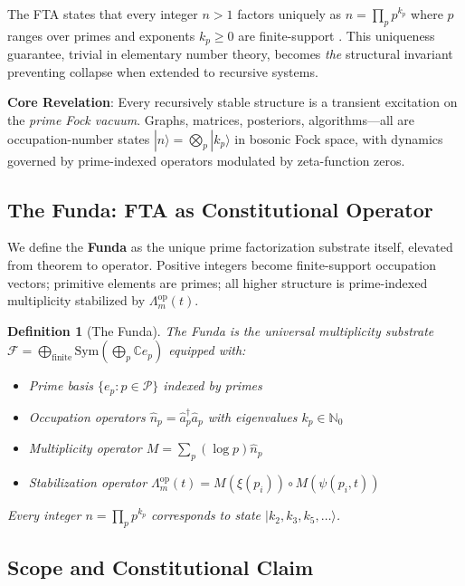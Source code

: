 \documentclass[12pt]{amsart}
\theoremstyle{plain}
\newtheorem{definition}[theorem]{Definition}
\begin{document}
The FTA states that every integer \(n > 1\) factors uniquely as \(n = \prod_p p^{k_p}\) where \(p\) ranges over primes and exponents \(k_p \geq 0\) are finite-support \cite{HardyWright1979}. This uniqueness guarantee, trivial in elementary number theory, becomes \emph{the} structural invariant preventing collapse when extended to recursive systems.

\textbf{Core Revelation}: Every recursively stable structure is a transient excitation on the \emph{prime Fock vacuum}. Graphs, matrices, posteriors, algorithms---all are occupation-number states \(|n\rangle = \bigotimes_p |k_p\rangle\) in bosonic Fock space, with dynamics governed by prime-indexed operators modulated by zeta-function zeros.

\subsection{The Funda: FTA as Constitutional Operator}

We define the \textbf{Funda} as the unique prime factorization substrate itself, elevated from theorem to operator. Positive integers become finite-support occupation vectors; primitive elements are primes; all higher structure is prime-indexed multiplicity stabilized by \(\Lambda_m^{\text{op}}(t)\).

\begin{definition}[The Funda]
The Funda is the universal multiplicity substrate \\ \(\mathcal{F} = \bigoplus_{\text{finite}} \text{Sym}(\bigoplus_p \mathbb{C} e_p)\) equipped with:
\begin{itemize}
\item Prime basis \(\{e_p : p \in \mathcal{P}\}\) indexed by primes
\item Occupation operators \(\hat{n}_p = \hat{a}_p^\dagger \hat{a}_p\) with eigenvalues \(k_p \in \mathbb{N}_0\)
\item Multiplicity operator \(M = \sum_p (\log p) \hat{n}_p\)
\item Stabilization operator \(\Lambda_m^{\text{op}}(t) = M(\xi(p_i)) \circ M(\psi(p_i,t))\)
\end{itemize}
Every integer \(n = \prod_p p^{k_p}\) corresponds to state \(|k_2, k_3, k_5, \ldots\rangle\).
\end{definition}

\subsection{Scope and Constitutional Claim}
\end{document}
